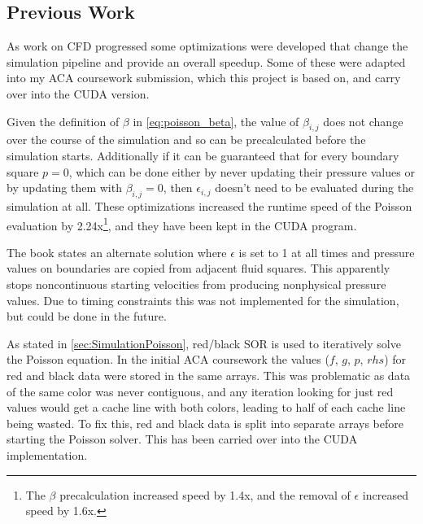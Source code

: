 \subsection{Previous Work}
\label{research:prev_work}
As work on CFD progressed some optimizations were developed that change the simulation pipeline and provide an overall speedup.
Some of these were adapted into my ACA coursework submission\cite{modules:aca257submission}, which this project is based on, and carry over into the CUDA version.


Given the definition of $\beta$ in \cref{eq:poisson_beta}, the value of $\beta_{i,j}$ does not change over the course of the simulation and so can be precalculated before the simulation starts.
Additionally if it can be guaranteed that for every boundary square $p = 0$, which can be done either by never updating their pressure values or by updating them with $\beta_{i,j} = 0$, then $\epsilon_{i,j}$ doesn't need to be evaluated during the simulation at all.
These optimizations increased the runtime speed of the Poisson evaluation by 2.24x\footnote{The $\beta$ precalculation increased speed by 1.4x, and the removal of $\epsilon$ increased speed by 1.6x.\cite{modules:aca257submission}}, and they have been kept in the CUDA program.

The book states an alternate solution where $\epsilon$ is set to 1 at all times and pressure values on boundaries are copied from adjacent fluid squares\cite{book:griebel1998numerical}.
This apparently stops noncontinuous starting velocities from producing nonphysical pressure values.
Due to timing constraints this was not implemented for the simulation, but could be done in the future.
\label{ext:PressureValues}


As stated in \cref{sec:SimulationPoisson}, red/black SOR is used to iteratively solve the Poisson equation.
In the initial ACA coursework the values ($f$, $g$, $p$, $rhs$) for red and black data were stored in the same arrays.
This was problematic as data of the same color was never contiguous, and any iteration looking for just red values would get a cache line with both colors, leading to half of each cache line being wasted.
To fix this, red and black data is split into separate arrays before starting the Poisson solver.
This has been carried over into the CUDA implementation.

